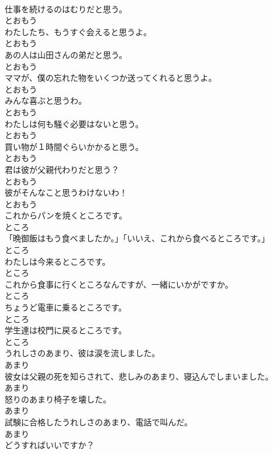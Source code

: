 \documentclass[8pt]{extreport}
\begin{document}
\begin{CJK}{UTF8}{min}
\\	仕事を続けるのはむりだと思う。	
\\	とおもう	
\\	わたしたち、もうすぐ会えると思うよ。	
\\	とおもう	
\\	あの人は山田さんの弟だと思う。	
\\	とおもう	
\\	ママが、僕の忘れた物をいくつか送ってくれると思うよ。	
\\	とおもう	
\\	みんな喜ぶと思うわ。	
\\	とおもう	
\\	わたしは何も騒ぐ必要はないと思う。	
\\	とおもう	
\\	買い物が１時間ぐらいかかると思う。	
\\	とおもう	
\\	君は彼が父親代わりだと思う？	
\\	とおもう	
\\	彼がそんなこと思うわけないわ！	
\\	とおもう	
\\	これからパンを焼くところです。	
\\	ところ	
\\	「晩御飯はもう食べましたか。」「いいえ、これから食べるところです。」	
\\	ところ	
\\	わたしは今来るところです。	
\\	ところ	
\\	これから食事に行くところなんですが、一緒にいかがですか。	
\\	ところ	
\\	ちょうど電車に乗るところです。	
\\	ところ	
\\	学生達は校門に戻るところです。	
\\	ところ	
\\	うれしさのあまり、彼は涙を流しました。	
\\	あまり	
\\	彼女は父親の死を知らされて、悲しみのあまり、寝込んでしまいました。	
\\	あまり	
\\	怒りのあまり椅子を壊した。	
\\	あまり	
\\	試験に合格したうれしさのあまり、電話で叫んだ。	
\\	あまり	
\\	どうすればいいですか？	

\end{CJK}
\end{document}
